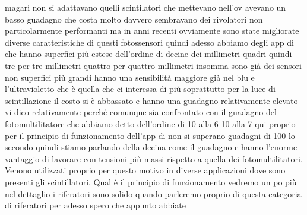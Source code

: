 magari non si adattavano quelli scintilatori che mettevano nell'ov avevano un basso guadagno che costa molto davvero sembravano dei rivolatori non particolarmente performanti ma in anni recenti ovviamente sono state migliorate diverse caratteristiche di questi fotossensori quindi adesso abbiamo degli app di che hanno superfici più estese dell'ordine di decine dei millimetri quadri quindi tre per tre millimetri quattro per quattro millimetri insomma sono già dei sensori non superfici più grandi hanno una sensibilità maggiore già nel blu e l'ultravioletto che è quella che ci interessa di più soprattutto per la luce di scintillazione il costo si è abbassato e hanno una guadagno relativamente elevato vi dico relativamente perché comunque sia confrontato con il guadagno del fotomultilitatore che abbiamo detto dell'ordine di 10 alla 6 10 alla 7 qui proprio per il principio di funzionamento dell'app di non si superano guadagni di 100 lo secondo quindi stiamo parlando della decina come il guadagno e hanno l'enorme vantaggio di lavorare con tensioni più massi rispetto a quella dei fotomultilitatori. Venono utilizzati proprio per questo motivo in diverse applicazioni dove sono presenti gli scintillatori. Qual è il principio di funzionamento vedremo un po più nel dettaglio i riferatori sono solido quando parleremo proprio di questa categoria di riferatori per adesso spero che appunto abbiate 


